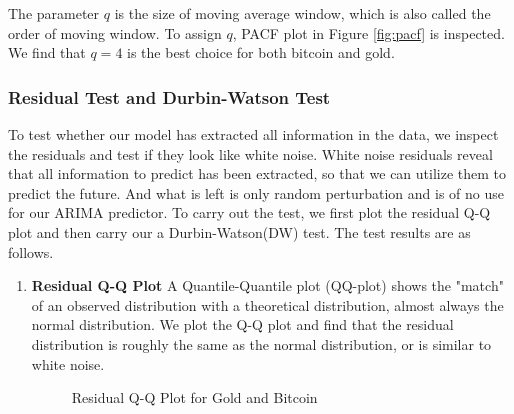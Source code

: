 \documentclass[12pt,a4paper]{article}
\newcommand{\Predictor}{ARIMA }
\begin{document}
\begin{spacing}{1.2}
The parameter $q$ is the size of moving average window, which is also called the order of moving window. To assign $q$, PACF plot in Figure \ref{fig:pacf} is inspected. We find that $q=4$ is the best choice for both bitcoin and gold.


\subsubsection{Residual Test and Durbin-Watson Test}
To test whether our model has extracted all information in the data, we inspect the residuals and test if they look like white noise. White noise residuals reveal that all information to predict has been extracted, so that we can utilize them to predict the future. And what is left is only random perturbation and is of no use for our \Predictor predictor. To carry out the test, we first plot the residual Q-Q plot and then carry our a Durbin-Watson(DW) test. The test results are as follows.

\begin{enumerate}
	\item \textbf{Residual Q-Q Plot}
	A Quantile-Quantile plot (QQ-plot) shows the "match" of an observed distribution with a theoretical distribution, almost always the normal distribution. We plot the Q-Q plot and find that the residual distribution is roughly the same as the normal distribution, or is similar to white noise.
	
	\begin{figure}
		\begin{center}
		\end{center}
			\caption{Residual Q-Q Plot for Gold and Bitcoin}
		\label{fig:qq_plot}
	\end{figure}


\end{enumerate}
\end{spacing}
\end{document}
